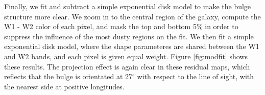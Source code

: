 \documentclass[12pt, preprint]{aastex}
\begin{document}
Finally, we fit and subtract a simple exponential disk model to make the bulge structure more clear.  We zoom in to the central region of the galaxy, compute the W1 - W2 color of each pixel, and mask the top and bottom 5\% in order to suppress the influence of the most dusty regions on the fit.  We then fit a simple exponential disk model, where the shape parameteres are shared between the W1 and W2 bands, and each pixel is given equal weight.
Figure \ref{fig:modfit} shows these results.
The projection effect is again clear in these residual maps, which reflects that the bulge is orientated at 27$^\circ$ with respect to the line of sight, with the nearest side at  positive longitudes. %
\end{document}
